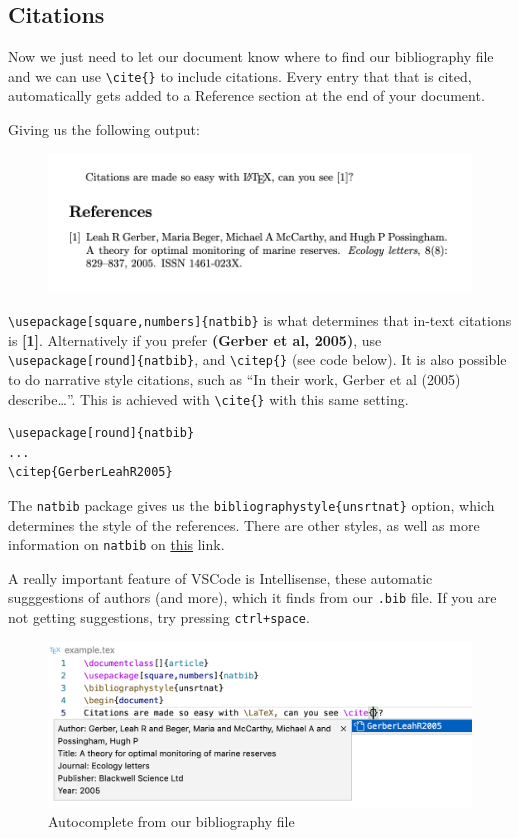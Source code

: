 \subsection{Citations}
Now we just need to let our document know where to find our bibliography file and we can use \verb|\cite{}| to include citations.
Every entry that that is cited, automatically gets added to a Reference section at the end of your document.


Giving us the following output:
\begin{figure}[h]
  \centering
    \includegraphics[]{figures/references.png}
  \label{fig:references}
\end{figure}

\verb|\usepackage[square,numbers]{natbib}| is what determines that in-text citations is \textbf{[1]}.
Alternatively if you prefer \textbf{(Gerber et al, 2005)}, use \verb|\usepackage[round]{natbib}|, and \verb|\citep{}| (see code below).
It is also possible to do narrative style citations, such as ``In their work, Gerber et al (2005) describe\dots''. This is achieved with \verb|\cite{}| with this same setting.

\begin{lstlisting}
\usepackage[round]{natbib}
...
\citep{GerberLeahR2005}
\end{lstlisting}

The \verb|natbib| package gives us the \verb|bibliographystyle{unsrtnat}| option, which determines the style of the references.
There are other styles, as well as more information on \verb|natbib| on \href{https://ftp.eq.uc.pt/software/TeX/macros/latex/contrib/natbib/natnotes.pdf}{this} link. 

A really important feature of VSCode is Intellisense, these automatic sugggestions of authors (and more), which it finds from our \verb|.bib| file.
If you are not getting suggestions, try pressing \verb|ctrl+space|.
\begin{figure}[h]
  \centering
  \includegraphics[width=\textwidth]{figures/intellisense.png}
  \caption{Autocomplete from our bibliography file}
  \label{fig:intellisense}
\end{figure}

